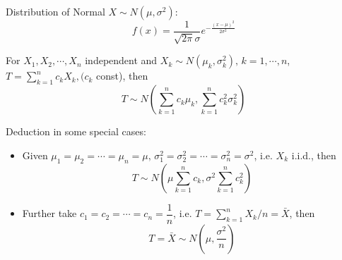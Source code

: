     Distribution of Normal $ X\sim N(\mu ,\sigma ^2) $:
    \[
        f(x)=\dfrac{1}{\sqrt{2\pi}\sigma }e^{-\frac{(x-\mu )^2}{2\sigma ^2}} 
    \]
    
    

    For $X_1,X_2,\cdots,X_n$ independent and $X_k\sim N(\mu_k,\sigma^2_k),\, k=1,\cdots,n$, $T={\displaystyle\sum_{k=1}^n c_kX_k}, (c_k$ const), then
    \begin{equation}
        T\sim N(\sum_{k=1}^nc_k\mu_k,\sum_{k=1}^n c_k^2\sigma^2_k)    
    \end{equation}

    Deduction in some special cases:
    \begin{itemize}
        \item Given $\mu_1=\mu_2=\cdots=\mu_n=\mu,\, \sigma^2_1=\sigma^2_2=\cdots=\sigma^2_n=\sigma^2$, i.e. $X_k$ i.i.d., then
        \begin{equation}\label{EqaDistributionOfSumOfiidNormal}
            T\sim   N(\mu\sum_{k=1}^n c_k,\sigma^2\sum_{k=1}^n c_k^2) 
        \end{equation}
        \item Further take $c_1=c_2=\cdots=c_n=\dfrac{1}{n}$, i.e. $T={\displaystyle \sum_{k=1}^n X_k /n}=\bar{X}$, then
        \begin{equation}    
            T=\bar{X}\sim N(\mu,\frac{\sigma^2}{n})    
        \end{equation}
    \end{itemize}





